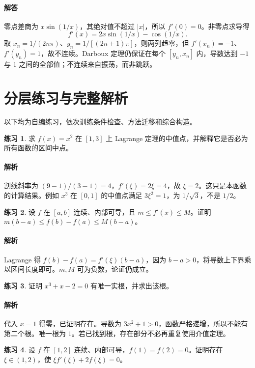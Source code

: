 \documentclass[UTF8,fontset=fandol,12pt,oneside,openany]{ctexrep}
\theoremstyle{definition}
\newtheorem{exercise}{练习}[chapter]
\begin{document}
\paragraph{解答}
零点差商为 $x\sin(1/x)$，其绝对值不超过 $|x|$，所以 $f'(0)=0$。非零点求导得
\[
f'(x)=2x\sin(1/x)-\cos(1/x).
\]
取 $x_n=1/(2n\pi)$、$y_n=1/[(2n+1)\pi]$，则两列趋零，但 $f'(x_n)=-1$、$f'(y_n)=1$，故不连续。Darboux 定理仍保证在每个 $[y_n,x_n]$ 内，导数达到 $-1$ 与 $1$ 之间的全部值；不连续来自振荡，而非跳跃。

\section{分层练习与完整解析}
以下均为自编练习，依次训练条件检查、方法迁移和综合构造。
\begin{exercise}
求 $f(x)=x^2$ 在 $[1,3]$ 上 Lagrange 定理的中值点，并解释它是否必为所有函数的区间中点。
\end{exercise}
\paragraph{解析}
割线斜率为 $(9-1)/(3-1)=4$，$f'(\xi)=2\xi=4$，故 $\xi=2$。这只是本函数的计算结果。例如 $x^3$ 在 $[0,1]$ 的中值点满足 $3\xi^2=1$，为 $1/\sqrt3$，不是 $1/2$。

\begin{exercise}
设 $f$ 在 $[a,b]$ 连续、内部可导，且 $m\le f'(x)\le M$。证明 $m(b-a)\le f(b)-f(a)\le M(b-a)$。
\end{exercise}
\paragraph{解析}
Lagrange 得 $f(b)-f(a)=f'(\xi)(b-a)$，因为 $b-a>0$，将导数上下界乘以区间长度即可。$m,M$ 可为负数，论证仍成立。

\begin{exercise}
证明 $x^3+x-2=0$ 有唯一实根，并求出该根。
\end{exercise}
\paragraph{解析}
代入 $x=1$ 得零，已证明存在。导数为 $3x^2+1>0$，函数严格递增，所以不能有第二个根。唯一根为 $1$。若已找到根，存在部分不必再重复使用介值定理。

\begin{exercise}
设 $f$ 在 $[1,2]$ 连续、内部可导，$f(1)=f(2)=0$。证明存在 $\xi\in(1,2)$，使 $\xi f'(\xi)+2f(\xi)=0$。
\end{exercise}
\end{document}
